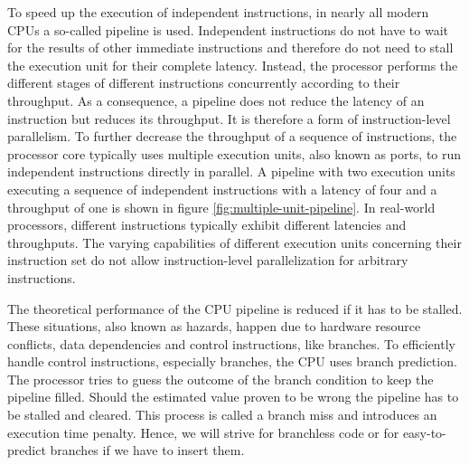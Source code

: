 \documentclass{stdlocal}
\begin{document}
    To speed up the execution of independent instructions, in nearly all modern CPUs a so-called pipeline is used.
    Independent instructions do not have to wait for the results of other immediate instructions and therefore do not need to stall the execution unit for their complete latency.
    Instead, the processor performs the different stages of different instructions concurrently according to their throughput.
    As a consequence, a pipeline does not reduce the latency of an instruction but reduces its throughput.
    It is therefore a form of instruction-level parallelism.
    To further decrease the throughput of a sequence of instructions, the processor core typically uses multiple execution units, also known as ports, to run independent instructions directly in parallel.
    A pipeline with two execution units executing a sequence of independent instructions with a latency of four and a throughput of one is shown in figure \ref{fig:multiple-unit-pipeline}.
    In real-world processors, different instructions typically exhibit different latencies and throughputs.
    The varying capabilities of different execution units concerning their instruction set do not allow instruction-level parallelization for arbitrary instructions.
    \autocite{dolbeau2016,fog2019a,fog2019d,intel-kaby-lake,intel-intrinsics-guide}

    The theoretical performance of the CPU pipeline is reduced if it has to be stalled.
    These situations, also known as hazards, happen due to hardware resource conflicts, data dependencies and control instructions, like branches.
    To efficiently handle control instructions, especially branches, the CPU uses branch prediction.
    The processor tries to guess the outcome of the branch condition to keep the pipeline filled.
    Should the estimated value proven to be wrong the pipeline has to be stalled and cleared.
    This process is called a branch miss and introduces an execution time penalty.
    Hence, we will strive for branchless code or for easy-to-predict branches if we have to insert them.
    \autocite{hennessy2019,patterson2014,fog2019a}
\end{document}
